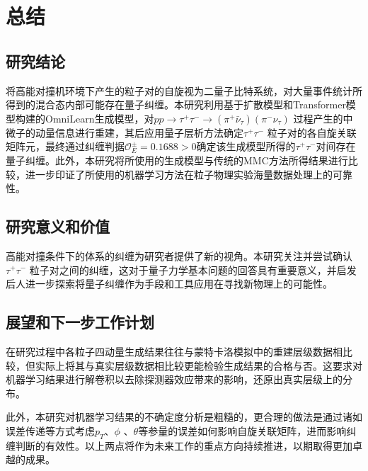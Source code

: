 \chapter{总结}
\label{chap:conclusion}

\section{研究结论}
\label{sec:fivepone}
将高能对撞机环境下产生的粒子对的自旋视为二量子比特系统，对大量事件统计所得到的混合态内部可能存在量子纠缠。本研究利用基于扩散模型和Transformer模型构建的OmniLearn生成模型，对$pp \to \tau^+ \tau^- \to (\pi^+ \bar{\nu}_{\tau}) (\pi^- \nu_{\tau})$ 过程产生的中微子的动量信息进行重建，其后应用量子层析方法确定$\tau^+ \tau^-$ 粒子对的各自旋关联矩阵元，最终通过纠缠判据$\mathcal{O}_{E}^{\pm}=0.1688>0 $确定该生成模型所得的$\tau^+ \tau^- $对间存在量子纠缠。此外，本研究将所使用的生成模型与传统的MMC方法所得结果进行比较，进一步印证了所使用的机器学习方法在粒子物理实验海量数据处理上的可靠性。

\section{研究意义和价值}
\label{sec:fiveptwo}
高能对撞条件下的体系的纠缠为研究者提供了新的视角。本研究关注并尝试确认$\tau^+ \tau^-$ 粒子对之间的纠缠，这对于量子力学基本问题的回答具有重要意义，并启发后人进一步探索将量子纠缠作为手段和工具应用在寻找新物理上的可能性。

\section{展望和下一步工作计划}
\label{sec:fivepthree}
在研究过程中各粒子四动量生成结果往往与蒙特卡洛模拟中的重建层级数据相比较，但实际上将其与真实层级数据相比较更能检验生成结果的合格与否。这要求对机器学习结果进行解卷积以去除探测器效应带来的影响，还原出真实层级上的分布。

此外，本研究对机器学习结果的不确定度分析是粗糙的，更合理的做法是通过诸如误差传递等方式考虑$p_T$、$\phi$ 、$\theta$等参量的误差如何影响自旋关联矩阵，进而影响纠缠判断的有效性。以上两点将作为未来工作的重点方向持续推进，以期取得更加卓越的成果。